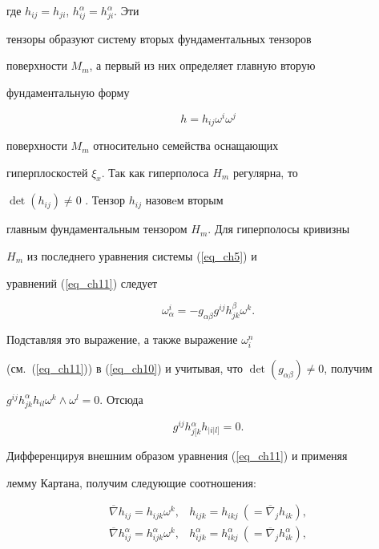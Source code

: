 где $h_{ij}=h_{ji}$, $h_{ij}^{\alpha}=h_{ji}^{\alpha}$. Эти


тензоры образуют систему вторых фундаментальных тензоров


поверхности $M_m$, а первый из них определяет главную вторую


фундаментальную форму


$$


h=h_{ij}\omega^i\omega^j


$$


поверхности $M_m$ относительно семейства оснащающих


гиперплоскостей $\xi_x$. Так как гиперполоса $H_m$ регулярна, то


$\det (h_{ij})\neq 0$ \cite{chak2}. Тензор $h_{ij}$ назовeм вторым


главным фундаментальным тензором $H_m$. Для гиперполосы кривизны


$H_m$ из последнего уравнения системы (\ref{eq_ch5}) и


уравнений (\ref{eq_ch11}) следует


$$


\omega^i_{\alpha}=-g_{\alpha\beta}g^{ij}h^{\beta}_{jk}\omega^k.


$$


Подставляя это выражение, а также выражение $\omega^n_i$


(см.~(\ref{eq_ch11})) в (\ref{eq_ch10}) и учитывая, что $\det


(g_{\alpha\beta})\neq 0$, получим


$g^{ij}h^{\alpha}_{jk}h_{il}\omega^k\wedge\omega^l=0$. Отсюда


\begin{equation}


\label{eq_ch12}


g^{ij}h{}^{\alpha}_{j[k}h{}_{\vert i\vert l]}=0.


\end{equation}


Дифференцируя внешним образом уравнения (\ref{eq_ch11}) и применяя


лемму Картана, получим следующие соотношения:


\begin{equation}


\label{eq_ch13}


\begin{array}{ll}


\overline{\nabla}h_{ij}=h_{ijk}\omega^k, & h_{ijk}=h_{ikj}


\ (=\overline{\nabla}_jh_{ik}), \\[2mm]


\overline{\nabla}h_{ij}^{\alpha}=h_{ijk}^{\alpha}\omega^k, & h^{\alpha}_{ijk}=


h^{\alpha}_{ikj}\  (=\overline{\nabla}_jh^{\alpha}_{ik}),


\end{array}


\end{equation}


